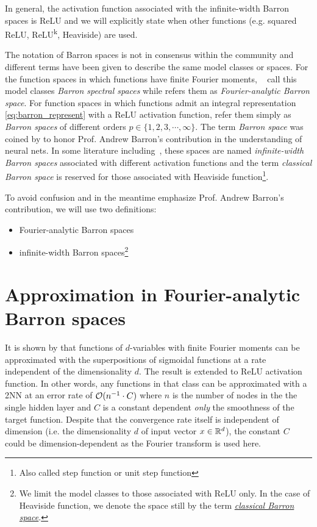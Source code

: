 \TODO

In general, the activation function associated with the infinite-width Barron
spaces is ReLU and we will explicitly state when other functions (e.g. squared
ReLU, ReLU\textsuperscript{k}, Heaviside) are used.

The notation of Barron spaces is not in consensus within the community and
different terms have been given to describe the same model classes or spaces.
For the function spaces in which functions have finite Fourier moments,
~\cite{xuFiniteNeuronMethod2020} call this model classes \textit{Barron spectral
spaces} while \cite{carageaNeuralNetworkApproximation2022} refers them as
\textit{Fourier-analytic Barron space}.  For function spaces in which functions
admit an integral representation \eqref{eq:barron_represent} with a ReLU
activation function, \cite{eBarronSpaceFlowinduced2021} refer them simply as
\textit{Barron spaces} of different orders $p \in \{1, 2, 3, \cdots, \infty\}$.
The term \textit{Barron space} was coined by
\cite{ePrioriEstimatesPopulation2019} to honor Prof. Andrew Barron's
contribution in the understanding of neural nets. In some literature
including~\cite{carageaNeuralNetworkApproximation2022}, these spaces are named
\textit{infinite-width Barron spaces} associated with different activation
functions and the term \textit{classical Barron space} is reserved for those
associated with Heaviside function\footnote{Also called step function or unit
step function}.

To avoid confusion and in the meantime emphasize Prof. Andrew Barron's
contribution, we will use two definitions:
\begin{itemize}
    \item Fourier-analytic Barron spaces
    \item infinite-width Barron spaces\footnote{
        We limit the model classes to those associated with ReLU only. In the 
        case of Heaviside function, we denote the space still by the term 
        \hyperref[def:heaviside_space]{\textit{classical Barron space}}.
    }
\end{itemize}


\section{Approximation in Fourier-analytic Barron spaces}
\label{sec:spectral_norm}

It is shown by \cite{barronUniversalApproximationBounds1993} that functions of
$d$-variables with finite Fourier moments can be approximated with the
superpositions of sigmoidal functions at a rate independent of the
dimensionality $d$. The result is extended to ReLU activation function. In other
words, any functions in that class can be approximated with a 2NN at an error
rate of $\mathcal{O}(n^{-1} \cdot C)$ where $n$ is the number of nodes in the the
single hidden layer and $C$ is a constant dependent \textit{only} the smoothness
of the target function. Despite that the convergence rate itself is independent
of dimension (i.e. the dimensionality $d$ of input vector $x\in\mathbb{R}^d$), the
constant $C$ could be dimension-dependent as the Fourier transform is used here.

